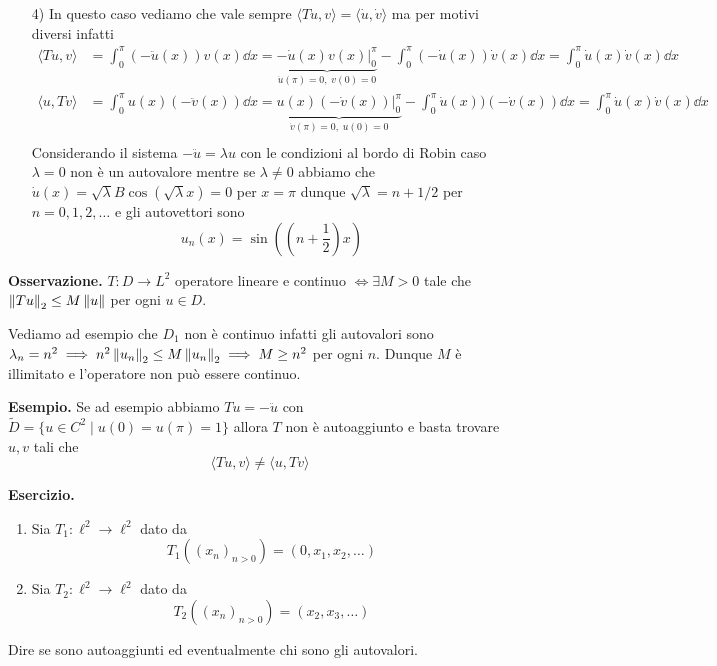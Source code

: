 \begin{enumerate}
	\item[4)]
		In questo caso vediamo che vale sempre $\langle Tu, v \rangle = \langle \dot u, \dot v \rangle$ ma per motivi diversi infatti
		$$
		\begin{aligned}
			\langle Tu, v \rangle 
			&= \int_0^\pi (-\ddot u(x)) v(x) \dd x 
			= \underbrace{-\dot u(x) v(x) \bigg|_0^\pi}_{\dot u(\pi) = 0, \; v(0) = 0} - \int_0^\pi (-\dot u(x)) \dot v(x) \dd x 
			= \int_0^\pi \dot u(x) \dot v(x) \dd x \\
			\langle u, Tv \rangle 
			&= \int_0^\pi u(x) (-\ddot v(x)) \dd x 
			= \underbrace{u(x) (-\dot v(x)) \bigg|_0^\pi}_{\dot v(\pi) = 0, \; u(0) = 0} - \int_0^\pi \dot u(x)) (-\dot v(x)) \dd x 
			= \int_0^\pi \dot u(x) \dot v(x) \dd x \\
		\end{aligned}
		$$
		Considerando il sistema $-\ddot u = \lambda u$ con le condizioni al bordo di Robin caso $\lambda = 0$ non è un autovalore mentre se $\lambda \neq 0$ abbiamo che $\dot u(x) = \sqrt{\lambda} B \cos(\sqrt{\lambda} x) = 0$ per $x = \pi$ dunque $\sqrt{\lambda} = n + 1/2$ per $n = 0, 1, 2, \dots$ e gli autovettori sono
		$$
		u_n(x) = \sin\left(\left( n + \frac{1}{2} \right)x\right)
		$$
\end{enumerate}

\textbf{Osservazione.}
$T \colon D \to L^2$ operatore lineare e continuo $\iff \exists M > 0$ tale che $\left\lVert Tu \right\rVert_2 \leq M\left\lVert u \right\rVert$ per ogni $u \in D$.

Vediamo ad esempio che $D_1$ non è continuo infatti gli autovalori sono $\lambda_n = n^2 \implies n^2 \left\lVert u_n \right\rVert_2 \leq M \left\lVert u_n \right\rVert_2 \implies M \geq n^2$ per ogni $n$. Dunque $M$ è illimitato e l'operatore non può essere continuo.

\textbf{Esempio.} Se ad esempio abbiamo $T u = -\ddot u$ con $\tilde D = \{ u \in C^2 \mid u(0) = u(\pi) = 1 \}$ allora $T$ non è autoaggiunto e basta trovare $u, v$ tali che
$$
\langle T u, v \rangle \neq \langle u, T v \rangle
$$

\textbf{Esercizio.}
\begin{enumerate}
	\item Sia $T_1 \colon \ell^2 \to \ell^2$ dato da
		$$
		T_1((x_n)_{n > 0}) = (0, x_1, x_2, \dots)
		$$
	\item Sia $T_2 \colon \ell^2 \to \ell^2$ dato da
		$$
		T_2((x_n)_{n > 0}) = (x_2, x_3, \dots)
		$$
\end{enumerate}
Dire se sono autoaggiunti ed eventualmente chi sono gli autovalori.

